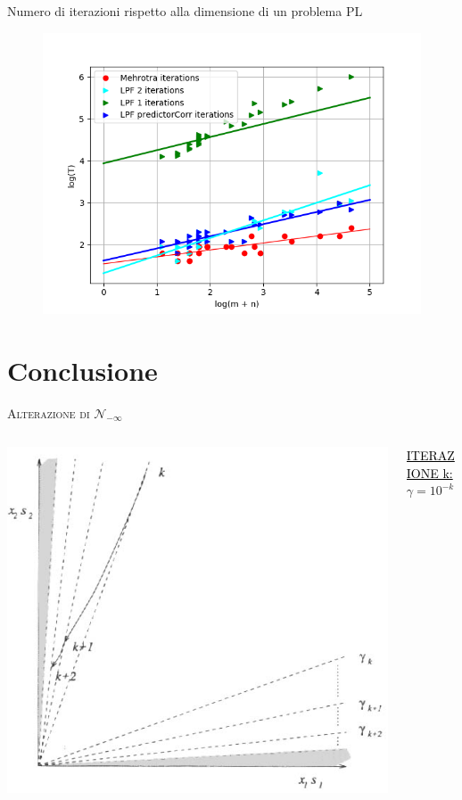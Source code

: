 \begin{frame}
	Numero di iterazioni rispetto alla dimensione di un problema PL
	\begin{figure}
		\includegraphics[width=0.5\paperwidth]{NUM.png}
	\end{figure}

\end{frame}


\section{Conclusione}

\begin{frame}{\textsc{\LARGE \textcolor{iris}{Alterazione di $\mathcal{N}_{-\infty}$}}}
	\begin{columns}
		\begin{column}{0.4\textwidth}
	\includegraphics[scale=0.3]{CONC.PNG}
\end{column}
\begin{column}{0.4\textwidth}
\textcolor{black}{\underline{ITERAZIONE k:}}\\
$\gamma = 10^{-k}$
\end{column}
\end{columns}
\end{frame}

